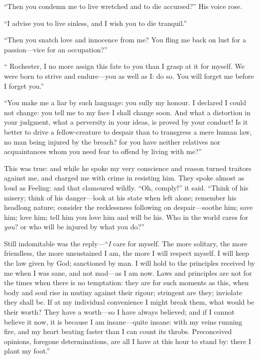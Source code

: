 \enquote{Then you condemn me to live wretched and to die accursed?} His
voice rose.

\enquote{I advise you to live sinless, and I wish you to die tranquil.}

\enquote{Then you snatch love and innocence from me? You fling me back
	on lust for a passion---vice for an occupation?}

\enquote{\Mr{} Rochester, I no more assign this fate to you than I grasp
	at it for myself. We were born to strive and endure---you as well as I:
	do so. You will forget me before I forget you.}

\enquote{You make me a liar by such language: you sully my honour. I
	declared I could not change: you tell me to my face I shall change
	soon. And what a distortion in your judgment, what a perversity in your
	ideas, is proved by your conduct! Is it better to drive a
	fellow-creature to despair than to transgress a mere human law, no man
	being injured by the breach? for you have neither relatives nor
	acquaintances whom you need fear to offend by living with me?}

This was true: and while he spoke my very conscience and reason turned
traitors against me, and charged me with crime in resisting him. They
spoke almost as loud as Feeling: and that clamoured wildly.
\enquote{Oh, comply!} it said. \enquote{Think of his misery; think of his
	danger---look at his state when left alone; remember his headlong
	nature; consider the recklessness following on despair---soothe him;
	save him; love him; tell him you love him and will be his. Who in the
	world cares for \emph{you}? or who will be injured by what you do?}

Still indomitable was the reply---\enquote{\emph{I} care for myself. The more
	solitary, the more friendless, the more unsustained I am, the more I
	will respect myself. I will keep the law given by God; sanctioned by
	man. I will hold to the principles received by me when I was sane, and
	not mad---as I am now. Laws and principles are not for the times when
	there is no temptation: they are for such moments as this, when body and
	soul rise in mutiny against their rigour; stringent are they; inviolate
	they shall be. If at my individual convenience I might break them, what
	would be their worth? They have a worth---so I have always believed;
	and if I cannot believe it now, it is because I am insane---quite
	insane: with my veins running fire, and my heart beating faster than I
	can count its throbs. Preconceived opinions, foregone determinations,
	are all I have at this hour to stand by: there I plant my foot.}


